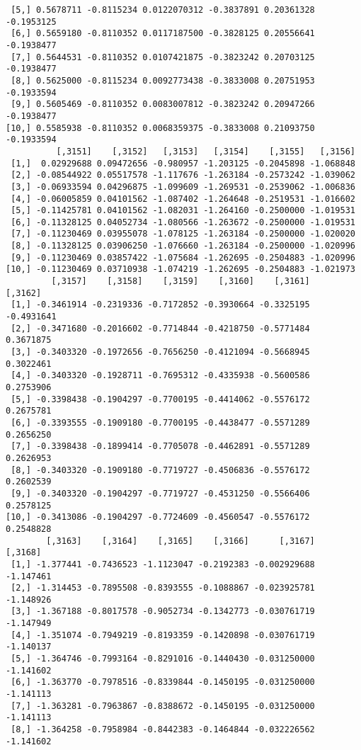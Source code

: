 \documentclass[
  letterpaper,
  DIV=11,
  numbers=noendperiod]{scrreprt}
\begin{document}
\begin{verbatim}
 [5,] 0.5678711 -0.8115234 0.0122070312 -0.3837891 0.20361328 -0.1953125
 [6,] 0.5659180 -0.8110352 0.0117187500 -0.3828125 0.20556641 -0.1938477
 [7,] 0.5644531 -0.8110352 0.0107421875 -0.3823242 0.20703125 -0.1938477
 [8,] 0.5625000 -0.8115234 0.0092773438 -0.3833008 0.20751953 -0.1933594
 [9,] 0.5605469 -0.8110352 0.0083007812 -0.3823242 0.20947266 -0.1938477
[10,] 0.5585938 -0.8110352 0.0068359375 -0.3833008 0.21093750 -0.1933594
          [,3151]    [,3152]   [,3153]   [,3154]    [,3155]   [,3156]
 [1,]  0.02929688 0.09472656 -0.980957 -1.203125 -0.2045898 -1.068848
 [2,] -0.08544922 0.05517578 -1.117676 -1.263184 -0.2573242 -1.039062
 [3,] -0.06933594 0.04296875 -1.099609 -1.269531 -0.2539062 -1.006836
 [4,] -0.06005859 0.04101562 -1.087402 -1.264648 -0.2519531 -1.016602
 [5,] -0.11425781 0.04101562 -1.082031 -1.264160 -0.2500000 -1.019531
 [6,] -0.11328125 0.04052734 -1.080566 -1.263672 -0.2500000 -1.019531
 [7,] -0.11230469 0.03955078 -1.078125 -1.263184 -0.2500000 -1.020020
 [8,] -0.11328125 0.03906250 -1.076660 -1.263184 -0.2500000 -1.020996
 [9,] -0.11230469 0.03857422 -1.075684 -1.262695 -0.2504883 -1.020996
[10,] -0.11230469 0.03710938 -1.074219 -1.262695 -0.2504883 -1.021973
         [,3157]    [,3158]    [,3159]    [,3160]    [,3161]    [,3162]
 [1,] -0.3461914 -0.2319336 -0.7172852 -0.3930664 -0.3325195 -0.4931641
 [2,] -0.3471680 -0.2016602 -0.7714844 -0.4218750 -0.5771484  0.3671875
 [3,] -0.3403320 -0.1972656 -0.7656250 -0.4121094 -0.5668945  0.3022461
 [4,] -0.3403320 -0.1928711 -0.7695312 -0.4335938 -0.5600586  0.2753906
 [5,] -0.3398438 -0.1904297 -0.7700195 -0.4414062 -0.5576172  0.2675781
 [6,] -0.3393555 -0.1909180 -0.7700195 -0.4438477 -0.5571289  0.2656250
 [7,] -0.3398438 -0.1899414 -0.7705078 -0.4462891 -0.5571289  0.2626953
 [8,] -0.3403320 -0.1909180 -0.7719727 -0.4506836 -0.5576172  0.2602539
 [9,] -0.3403320 -0.1904297 -0.7719727 -0.4531250 -0.5566406  0.2578125
[10,] -0.3413086 -0.1904297 -0.7724609 -0.4560547 -0.5576172  0.2548828
        [,3163]    [,3164]    [,3165]    [,3166]      [,3167]   [,3168]
 [1,] -1.377441 -0.7436523 -1.1123047 -0.2192383 -0.002929688 -1.147461
 [2,] -1.314453 -0.7895508 -0.8393555 -0.1088867 -0.023925781 -1.148926
 [3,] -1.367188 -0.8017578 -0.9052734 -0.1342773 -0.030761719 -1.147949
 [4,] -1.351074 -0.7949219 -0.8193359 -0.1420898 -0.030761719 -1.140137
 [5,] -1.364746 -0.7993164 -0.8291016 -0.1440430 -0.031250000 -1.141602
 [6,] -1.363770 -0.7978516 -0.8339844 -0.1450195 -0.031250000 -1.141113
 [7,] -1.363281 -0.7963867 -0.8388672 -0.1450195 -0.031250000 -1.141113
 [8,] -1.364258 -0.7958984 -0.8442383 -0.1464844 -0.032226562 -1.141602

\end{verbatim}
\end{document}
